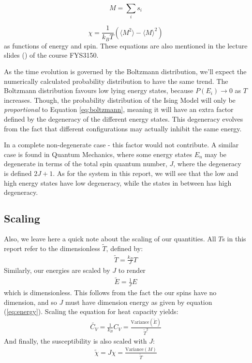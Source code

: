 \documentclass[12pt,english,a4paper]{article}
\begin{document}
\begin{equation}
M=\sum_is_i
\end{equation}

\begin{equation}
\chi= \frac{1}{k_B T}\left(\langle M^2\rangle-\langle M\rangle^2\right)
\end{equation}
as functions of energy and spin. These equations are also mentioned in the lecture slides (\cite{LectureIsing}) of the course FYS3150.

As the time evolution is governed by the Boltzmann distribution, we'll expect the numerically calculated probability distribution to have the same trend. The Boltzmann distribution favours low lying energy states, because $P(E_i)\rightarrow 0$ as $T$ increases. Though, the probability distribution of the Ising Model will only be \textit{proportional} to Equation \eqref{eq:boltzmann}, meaning it will have an extra factor defined by the degeneracy of the different energy states. This degeneracy evolves from the fact that different configurations may actually inhibit the same energy. 

In a complete non-degenerate case - this factor would not contribute. A similar case is found in Quantum Mechanics, where some energy states $E_{n}$ may be degenerate in terms of the total spin quantum number, $J$, where the degeneracy is defined $2J+1$. As for the system in this report, we will see that the low and high energy states have low degeneracy, while the states in between has high degeneracy.

\subsection{Scaling}
Also, we leave here a quick note about the scaling of our quantities. All $T$s in this report refer to the dimensionless $\tilde{T}$, defined by: 
\begin{align*}
    \tilde{T} = \frac{k_B}{J}T
\end{align*}
Similarly, our energies are scaled by $J$ to render
\begin{align*}
    \tilde{E} = \frac{1}{J}E
\end{align*}
which is dimensionless. This follows from the fact the our spins have no dimension, and so $J$ must have dimension energy as given by equation (\ref{eq:energy}). Scaling the equation for heat capacity yields: 
\begin{align*}
    \tilde{C_V} = \frac{1}{k_B}C_V = \frac{\text{Variance}(\tilde{E})}{\tilde{T}^2}
\end{align*}
And finally, the susceptibility is also scaled with $J$:
\begin{align*}
    \tilde{\chi} = J \chi = \frac{\text{Variance}(M)}{\tilde{T}}
\end{align*}
\end{document}
